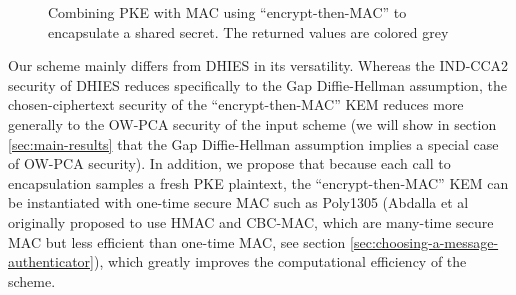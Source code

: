 \documentclass[journal=tches,submission]{iacrtrans}
\newcommand{\mac}{\texttt{MAC}}
\newcommand{\pk}{\texttt{pk}}
\newcommand{\leftsample}{\stackrel{\$}{\leftarrow}}
\begin{document}
\begin{figure}
    \centering

    \caption{Combining PKE with MAC using ``encrypt-then-MAC'' to encapsulate a shared secret. 
    The returned values are colored grey
    }\label{fig:etm-diagram}
\end{figure}

Our scheme mainly differs from DHIES in its versatility. Whereas the IND-CCA2 security of DHIES reduces specifically to the Gap Diffie-Hellman assumption, the chosen-ciphertext security of the ``encrypt-then-MAC'' KEM reduces more generally to the OW-PCA security \cite{DBLP:conf/ctrsa/OkamotoP01} of the input scheme (we will show in section \ref{sec:main-results} that the Gap Diffie-Hellman assumption implies a special case of OW-PCA security). In addition, we propose that because each call to encapsulation samples a fresh PKE plaintext, the ``encrypt-then-MAC'' KEM can be instantiated with one-time secure MAC such as Poly1305 (Abdalla et al originally proposed to use HMAC and CBC-MAC, which are many-time secure MAC but less efficient than one-time MAC, see section \ref{sec:choosing-a-message-authenticator}), which greatly improves the computational efficiency of the scheme.
\end{document}
